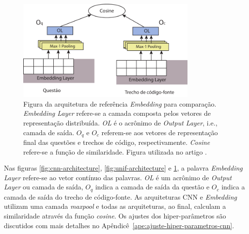 \begin{figure}[h]
    \centering
    \includegraphics[width=0.8\textwidth]{figuras/cap-experimento/embedding-architecture.pdf}
    \caption[Figura da arquitetura de referência \textit{Embedding} para comparação.]{Figura da arquitetura de referência \textit{Embedding} para comparação. \emph{Embedding Layer} refere-se a camada composta pelos vetores de representação distribuída. \emph{OL} é o acrônimo de \emph{Output Layer}, i.e., camada de saída. $O_{q}$ e $O_{c}$ referem-se aos vetores de representação final das questões e trechos de código, respectivamente. \emph{Cosine} refere-se a função de similaridade. Figura utilizada no artigo \cite{marcelo-vem-2019}.}
    \label{fig:embedding-architecture}
\end{figure}
Nas figuras \ref{fig:cnn-architecture}, \ref{fig:unif-architecture} e \ref{fig:embedding-architecture}, a palavra \textit{Embedding Layer} refere-se ao vetor contínuo das palavras. \emph{OL} é um acrônimo de \textit{Output Layer} ou camada de saída, $O_{q}$ indica a camada de saída da questão e $O_{c}$ indica a camada de saída do trecho de código-fonte. As arquiteturas CNN e \textit{Embedding} utilizam uma camada \textit{maxpool} e todas as arquiteturas, ao final, calculam a similaridade através da função \textit{cosine}. Os ajustes dos hiper-parâmetros são discutidos com mais detalhes no Apêndicê~\ref{ape:ajuste-hiper-parametros-cnn}.


